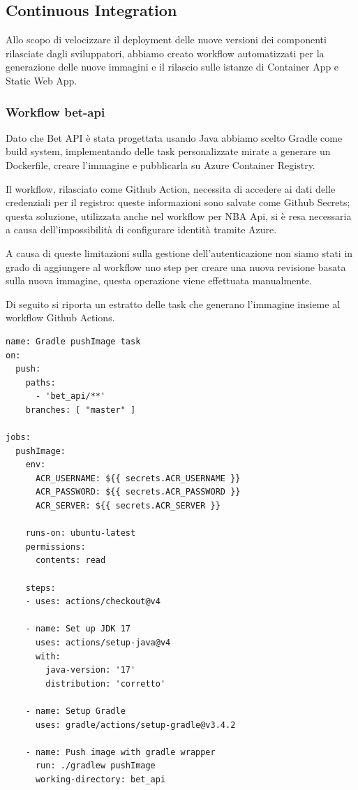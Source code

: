 \subsection{Continuous Integration}
Allo scopo di velocizzare il deployment delle nuove versioni dei componenti rilasciate dagli sviluppatori, abbiamo creato workflow automatizzati per la generazione delle nuove immagini e il rilascio sulle istanze di Container App e Static Web App.

\subsubsection{Workflow bet-api}
Dato che Bet API è stata progettata usando Java abbiamo scelto Gradle come build system, implementando delle task personalizzate mirate a generare un Dockerfile, creare l'immagine e pubblicarla su Azure Container Registry.

Il workflow, rilasciato come Github Action, necessita di accedere ai dati delle credenziali per il registro: queste informazioni sono salvate come Github Secrets; questa soluzione, utilizzata anche nel workflow per NBA Api, si è resa necessaria a causa dell'impossibilità di configurare identità tramite Azure.

A causa di queste limitazioni sulla gestione dell'autenticazione non siamo stati in grado di aggiungere al workflow uno step per creare una nuova revisione basata sulla nuova immagine, questa operazione viene effettuata manualmente.

Di seguito si riporta un estratto delle task che generano l'immagine insieme al workflow Github Actions.

\begin{verbatim}
name: Gradle pushImage task
on:
  push:
    paths:
      - 'bet_api/**'
    branches: [ "master" ]

jobs:
  pushImage:
    env:
      ACR_USERNAME: ${{ secrets.ACR_USERNAME }}
      ACR_PASSWORD: ${{ secrets.ACR_PASSWORD }}
      ACR_SERVER: ${{ secrets.ACR_SERVER }}

    runs-on: ubuntu-latest
    permissions:
      contents: read

    steps:
    - uses: actions/checkout@v4

    - name: Set up JDK 17
      uses: actions/setup-java@v4
      with:
        java-version: '17'
        distribution: 'corretto'

    - name: Setup Gradle
      uses: gradle/actions/setup-gradle@v3.4.2

    - name: Push image with gradle wrapper
      run: ./gradlew pushImage
      working-directory: bet_api
\end{verbatim}

